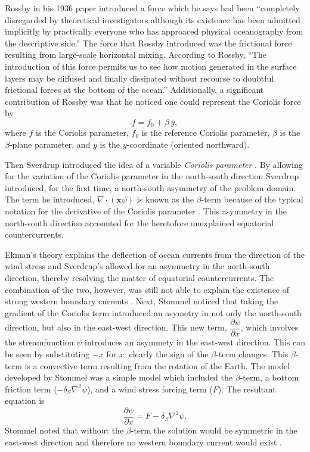 Rossby in his 1936 paper \cite{Rossby1936} introduced a force which he says had
been ``completely disregarded by theoretical investigators although its
existence has been admitted implicitly by practically everyone who has approaced
physical oceanography from the descriptive side.'' The force that Rossby
introduced was the frictional force resulting from large-scale horizontal
mixing. According to Rossby, ``The introduction of this force permits us to see
how motion generated in the surface layers may be diffused and finally
dissipated without recourse to doubtful frictional forces at the bottom of the
ocean.'' Additionally, a significant contribution of Rossby was that he noticed
one could represent the Coriolis force by \cite{James2009}
\begin{equation}
  f = f_0 + \beta\, y,
  \label{eqn:CoriolisParameterization}
\end{equation}
where $f$ is the Coriolis parameter, $f_0$ is the reference Coriolis parameter,
$\beta$ is the $\beta$-plane parameter, and $y$ is the $y$-coordinate (oriented
northward).

Then Sverdrup introduced the idea of a variable \emph{Coriolis parameter}
\cite{Fox-Kemper2003}. By allowing for the variation of the Coriolis parameter
in the north-south direction Sverdrup \cite{Sverdrup1947} introduced, for the
first time, a north-south asymmetry of the problem domain. The term he
introduced, $\nabla \cdot (\mathbf{x} \psi)$ is known as the $\beta$-term
because of the typical notation for the derivative of the Coriolis parameter
\cite{Fox-Kemper2003}. This asymmetry in the north-south direction accounted for
the heretofore unexplained equatorial countercurrents.

Ekman's theory explains the deflection of ocean currents from the direction of
the wind stress and Sverdrup's allowed for an asymmetry in the north-south
direction, thereby resolving the matter of equatorial countercurrents.  The
combination of the two, however, was still not able to explain the existence of
strong western boundary currents \cite{Fox-Kemper2003}.  Next, Stommel
\cite{Stommel1948} noticed that taking the gradient of the Coriolis term
introduced an asymetry in not only the north-south direction, but also in the
east-west direction. This new term, $\dfrac{\partial \psi}{\partial x}$, which
involves the streamfunction $\psi$ introduces an asymmety in the east-west
direction. This can be seen by substituting $-x$ for $x$: clearly the sign of
the $\beta$-term changes. This $\beta$-term is a convective term resulting from
the rotation of the Earth. The model developed by Stommel was a simple model
which included the $\beta$-term, a bottom friction term ($-\delta_S \nabla^2
\psi$), and a wind stress forcing term ($F$).  The resultant equation is
\cite{Fox-Kemper2003,Stommel1948,Vallis06}
\begin{equation}
  \frac{\partial \psi}{\partial x} = F - \delta_S \nabla^2 \psi.
  \label{eqn:StommelModel}
\end{equation}
Stommel noted that without the $\beta$-term the solution would be
symmetric in the east-west direction and therefore no western boundary current
would exist \cite{Stommel1948}.

